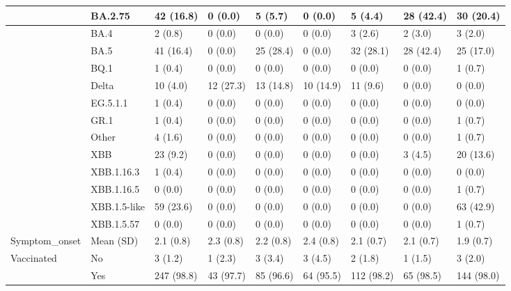 \begin{tabular}{l|l|l|l|l|l|l|l|l}
\hline
 & BA.2.75 & 42 (16.8) & 0 (0.0) & 5 (5.7) & 0 (0.0) & 5 (4.4) & 28 (42.4) & 30 (20.4)\\
\hline
 & BA.4 & 2 (0.8) & 0 (0.0) & 0 (0.0) & 0 (0.0) & 3 (2.6) & 2 (3.0) & 3 (2.0)\\
\hline
 & BA.5 & 41 (16.4) & 0 (0.0) & 25 (28.4) & 0 (0.0) & 32 (28.1) & 28 (42.4) & 25 (17.0)\\
\hline
 & BQ.1 & 1 (0.4) & 0 (0.0) & 0 (0.0) & 0 (0.0) & 0 (0.0) & 0 (0.0) & 1 (0.7)\\
\hline
 & Delta & 10 (4.0) & 12 (27.3) & 13 (14.8) & 10 (14.9) & 11 (9.6) & 0 (0.0) & 0 (0.0)\\
\hline
 & EG.5.1.1 & 1 (0.4) & 0 (0.0) & 0 (0.0) & 0 (0.0) & 0 (0.0) & 0 (0.0) & 0 (0.0)\\
\hline
 & GR.1 & 1 (0.4) & 0 (0.0) & 0 (0.0) & 0 (0.0) & 0 (0.0) & 0 (0.0) & 1 (0.7)\\
\hline
 & Other & 4 (1.6) & 0 (0.0) & 0 (0.0) & 0 (0.0) & 0 (0.0) & 0 (0.0) & 1 (0.7)\\
\hline
 & XBB & 23 (9.2) & 0 (0.0) & 0 (0.0) & 0 (0.0) & 0 (0.0) & 3 (4.5) & 20 (13.6)\\
\hline
 & XBB.1.16.3 & 1 (0.4) & 0 (0.0) & 0 (0.0) & 0 (0.0) & 0 (0.0) & 0 (0.0) & 0 (0.0)\\
\hline
 & XBB.1.16.5 & 0 (0.0) & 0 (0.0) & 0 (0.0) & 0 (0.0) & 0 (0.0) & 0 (0.0) & 1 (0.7)\\
\hline
 & XBB.1.5-like & 59 (23.6) & 0 (0.0) & 0 (0.0) & 0 (0.0) & 0 (0.0) & 0 (0.0) & 63 (42.9)\\
\hline
 & XBB.1.5.57 & 0 (0.0) & 0 (0.0) & 0 (0.0) & 0 (0.0) & 0 (0.0) & 0 (0.0) & 1 (0.7)\\
\hline
Symptom\_onset & Mean (SD) & 2.1 (0.8) & 2.3 (0.8) & 2.2 (0.8) & 2.4 (0.8) & 2.1 (0.7) & 2.1 (0.7) & 1.9 (0.7)\\
\hline
Vaccinated & No & 3 (1.2) & 1 (2.3) & 3 (3.4) & 3 (4.5) & 2 (1.8) & 1 (1.5) & 3 (2.0)\\
\hline
 & Yes & 247 (98.8) & 43 (97.7) & 85 (96.6) & 64 (95.5) & 112 (98.2) & 65 (98.5) & 144 (98.0)\\
\hline
\end{tabular}
